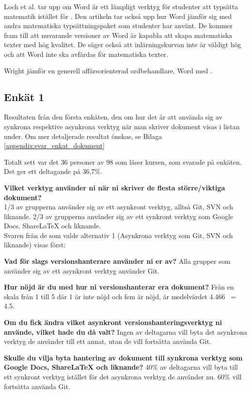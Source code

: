 Loch et al. \cite{loch2014master} tar upp om Word är ett lämpligt verktyg för studenter att typsätta matematik istället för \latex. Den artikeln tar också upp hur Word jämför sig med andra matematiska typsättningspaket som studenter har använt. De kommer fram till att nuvarande versioner av Word är kapabla att skapa matematiska texter med hög kvalitet. De säger också att inlärningskurvan inte är väldigt hög och att Word inte ska avfärdas för matematiska texter.  

Wright \cite{wright2010technical} jämför en generell affärsorienterad ordbehandlare, Word med \latex.  


\subsection{Enkät 1}
Resultaten från den första enkäten, den om hur det är att använda sig av synkrona respektive asynkrona verktyg när man skriver dokument visas i listan under. Om mer detaljerade resultat önskas, se Bilaga \ref{appendix:svar_enkat_dokument}

Totalt sett var det 36 personer av 98 som läser kursen, som svarade på enkäten. Det ger ett deltagande på 36,7\%.

\textbf{Vilket verktyg använder ni när ni skriver de flesta större/viktiga dokument?}
\\1/3 av grupperna använder sig av ett asynkront verktyg, alltså Git, SVN och liknande. 2/3 av grupperna använder sig av ett synkront verktyg som Google Docs, ShareLaTeX och liknande.
\\Svaren från de som valde alternativ 1 (Asynkrona verktyg som Git, SVN och liknande) visas först:

\textbf{Vad för slags versionshanterare använder ni er av?}
Alla grupper som använder sig av ett asynkront verktyg använder Git.

\textbf{Hur nöjd är du med hur ni versionshanterar era dokument?}
Från en skala från 1 till 5 där 1 är inte nöjd och fem är nöjd, är medelvärdet 4.466 ~= 4.5.

\textbf{Om du fick ändra vilket asynkront versionshanteringsverktyg ni använde, vilket hade du då valt?}
Ingen av deltagarna vill byta det asynkrona verktyg de använder till ett annat, utan de vill fortsätta använda Git.

\textbf{Skulle du vilja byta hantering av dokument till synkrona verktyg som Google Docs, ShareLaTeX och liknande?}
40\% av deltagarna vill byta till ett synkront verktyg istället för det asynkrona verktyg de använder nu. 60\% vill fortsätta använda Git.

